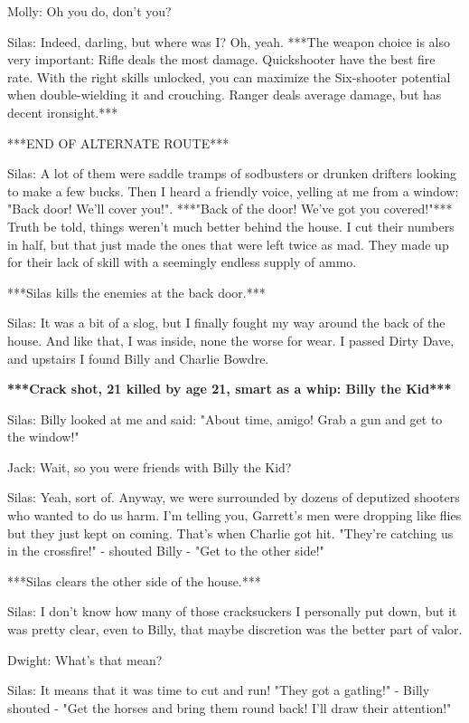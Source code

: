 \documentclass{article}
\begin{document}
Molly: Oh you do, don't you?

Silas: Indeed, darling, but where was I? Oh, yeah. ***The weapon choice is also very important: Rifle deals the most damage. Quickshooter have the best fire rate. With the right skills unlocked, you can maximize the Six-shooter potential when double-wielding it and crouching. Ranger deals average damage, but has decent ironsight.***

***END OF ALTERNATE ROUTE***

Silas: A lot of them were saddle tramps of sodbusters or drunken drifters looking to make a few bucks. Then I heard a friendly voice, yelling at me from a window: "Back door! We'll cover you!". ***"Back of the door! We've got you covered!"*** Truth be told, things weren't much better behind the house. I cut their numbers in half, but that just made the ones that were left twice as mad. They made up for their lack of skill with a seemingly endless supply of ammo.

***Silas kills the enemies at the back door.***

Silas: It was a bit of a slog, but I finally fought my way around the back of the house. And like that, I was inside, none the worse for wear. I passed Dirty Dave, and upstairs I found Billy and Charlie Bowdre.

\textbf{***Crack shot, 21 killed by age 21, smart as a whip: Billy the Kid***}

Silas: Billy looked at me and said: "About time, amigo! Grab a gun and get to the window!"

Jack: Wait, so you were friends with Billy the Kid?

Silas: Yeah, sort of. Anyway, we were surrounded by dozens of deputized shooters who wanted to do us harm. I'm telling you, Garrett's men were dropping like flies but they just kept on coming. That's when Charlie got hit. "They're catching us in the crossfire!" - shouted Billy - "Get to the other side!"

***Silas clears the other side of the house.***

Silas: I don't know how many of those cracksuckers I personally put down, but it was pretty clear, even to Billy, that maybe discretion was the better part of valor.

Dwight: What's that mean?

Silas: It means that it was time to cut and run! "They got a gatling!" - Billy shouted - "Get the horses and bring them round back! I'll draw their attention!"
\end{document}
